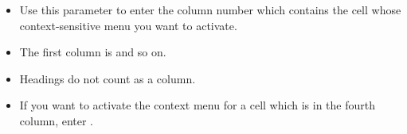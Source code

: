 \begin{itemize}
\item Use this parameter to enter the column number which contains the cell whose context-sensitive menu you want to activate.
\item The first column is  and so on.
\item Headings do not count as a column.
\item If you want to activate the context menu for  a cell which is in the fourth column, enter . 

\end{itemize}
